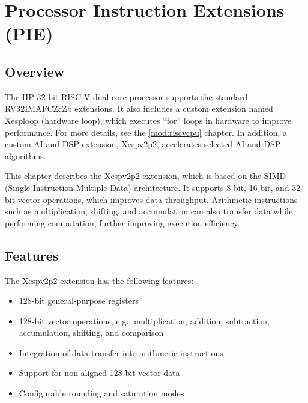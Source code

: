 \documentclass[main\_\_EN.tex]{subfiles}
\begin{document}

\ifglobal
\else
    {\let\clearpage\relax \listoftodos}
    {\let\clearpage\relax \listofdonetodos}
    \tableofcontents
\fi



\hypertarget{pie}{}
\chapter{Processor Instruction Extensions (PIE)}
\label{mod:pie}

\section{Overview}

The \chipname{} HP 32-bit RISC-V dual-core processor supports the standard RV32IMAFCZcZb extensions. It also includes a custom extension named Xesploop (hardware loop), which executes ``for'' loops in hardware to improve performance. For more details, see the \ref{mod:riscvcpu} chapter. In addition, a custom AI and DSP extension, Xespv2p2, accelerates selected AI and DSP algorithms.


This chapter describes the Xespv2p2 extension, which is based on the SIMD (Single Instruction Multiple Data) architecture. It supports 8-bit, 16-bit, and 32-bit vector operations, which improves data throughput. Arithmetic instructions such as multiplication, shifting, and accumulation can also transfer data while performing computation, further improving execution efficiency.

\section{Features}

The Xespv2p2 extension has the following features:

\begin{itemize}
    \item 128-bit general-purpose registers
    \item 128-bit vector operations, e.g., multiplication, addition, subtraction, accumulation, shifting, and comparison
    \item Integration of data transfer into arithmetic instructions
    \item Support for non-aligned 128-bit vector data
    \item Configurable rounding and saturation modes

\end{itemize}
\end{document}

